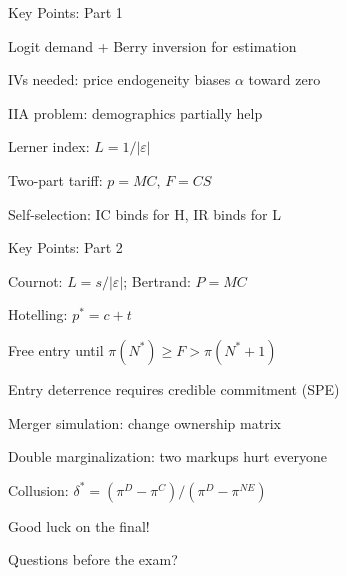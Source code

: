 \documentclass[notes,11pt, aspectratio=169]{beamer}
\newenvironment{wideitemize}{\itemize\addtolength{\itemsep}{10pt}}{\enditemize}
\newenvironment{wideenumerate}{\enumerate\addtolength{\itemsep}{10pt}}{\endenumerate}
\begin{document}

\begin{frame}{Key Points: Part 1}
	\vspace{11pt}
	\begin{wideenumerate}
		\item Logit demand + Berry inversion for estimation
		\item IVs needed: price endogeneity biases $\alpha$ toward zero
		\item IIA problem: demographics partially help
		\item Lerner index: $L = 1/|\varepsilon|$
		\item Two-part tariff: $p = MC$, $F = CS$
		\item Self-selection: IC binds for H, IR binds for L
	\end{wideenumerate}
\end{frame}

\begin{frame}{Key Points: Part 2}
	\vspace{11pt}
	\begin{wideenumerate}
		\item Cournot: $L = s/|\varepsilon|$; Bertrand: $P = MC$
		\item Hotelling: $p^* = c + t$
		\item Free entry until $\pi(N^*) \geq F > \pi(N^*+1)$
		\item Entry deterrence requires credible commitment (SPE)
		\item Merger simulation: change ownership matrix
		\item Double marginalization: two markups hurt everyone
		\item Collusion: $\delta^* = (\pi^D - \pi^C)/(\pi^D - \pi^{NE})$
	\end{wideenumerate}
\end{frame}

\begin{frame}{Good luck on the final!}
	\begin{wideitemize}
		\item Questions before the exam?
	\end{wideitemize}
\end{frame}
\end{document}
